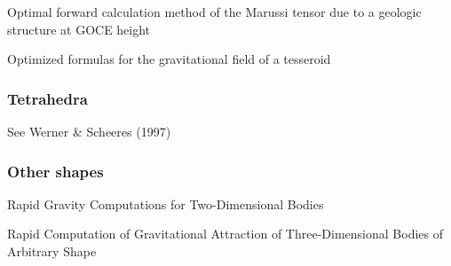 Optimal forward calculation method of the Marussi tensor due to a geologic structure at GOCE height 
\cite{uibb11}

Optimized formulas for the gravitational field of a tesseroid \cite{grsh13}

\subsubsection{Tetrahedra}

See Werner \& Scheeres (1997) \cite{wesc97}



\subsubsection{Other shapes}

\Literature

Rapid Gravity Computations for Two-Dimensional Bodies \cite{tawl59}

Rapid Computation of Gravitational Attraction of Three-Dimensional Bodies of Arbitrary Shape
\cite{taew60}




